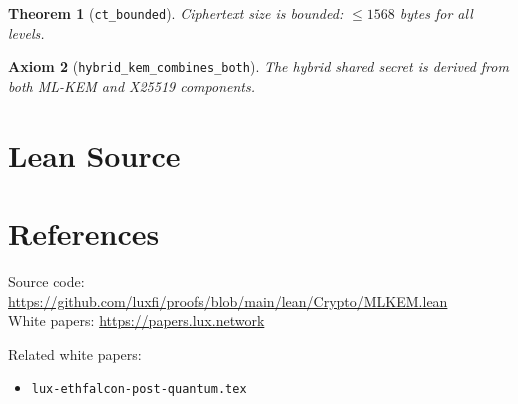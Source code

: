 \documentclass[11pt]{article}
\newtheorem{theorem}{Theorem}
\newtheorem{axiom_stmt}[theorem]{Axiom}
\begin{document}
\begin{theorem}[\texttt{ct\_bounded}]
Ciphertext size is bounded: $\leq 1568$ bytes for all levels.
\end{theorem}

\begin{axiom_stmt}[\texttt{hybrid\_kem\_combines\_both}]
The hybrid shared secret is derived from both ML-KEM and X25519 components.
\end{axiom_stmt}


\section{Lean Source}


\section{References}
\noindent Source code: \url{https://github.com/luxfi/proofs/blob/main/lean/Crypto/MLKEM.lean}\\
\noindent White papers: \url{https://papers.lux.network}

\noindent Related white papers:
\begin{itemize}
  \item \texttt{lux-ethfalcon-post-quantum.tex}
\end{itemize}
\end{document}
